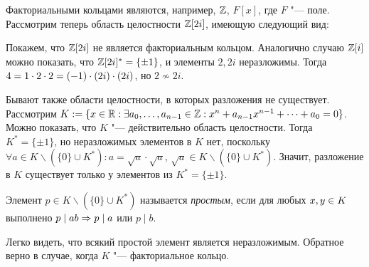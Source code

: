 \begin{example}
	Факториальными кольцами являются, например, $\mathbb{Z}$, $F[x]$, где $F$ "--- поле. Рассмотрим теперь область целостности $\mathbb{Z}[2i]$, имеющую следующий вид:
	\begin{center}
	\end{center}
	
	Покажем, что $\mathbb{Z}[2i]$ не является факториальным кольцом. Аналогично случаю $\mathbb{Z}[i]$ можно показать, что $\mathbb{Z}[2i]^* = \{\pm1\}$, и элементы $2, 2i$ неразложимы. Тогда $4 = 1 \cdot 2 \cdot 2 \hm= (-1)\cdot (2i) \cdot (2i)$, но $2 \not\sim 2i$.
\end{example}

\begin{note}
	Бывают также области целостности, в которых разложения не существует. Рассмотрим $K := \{x \in \mathbb{R}: \exists a_0, \dotsc, a_{n - 1} \in \mathbb{Z}: x^n + a_{n-1}x^{n-1} + \dotsb + a_0 = 0\}$. Можно показать, что $K$ "--- действительно область целостности. Тогда $K^* = \{\pm1\}$, но неразложимых элементов в $K$ нет, поскольку $\forall a \in K \backslash (\{0\} \cup K^*): a = \sqrt{a} \cdot \sqrt{a}$, $\sqrt{a} \in K \backslash (\{0\} \cup K^*)$. Значит, разложение в $K$ существует только у элементов из $K^* = \{\pm1\}$.
\end{note}

\begin{definition}
	Элемент $p \in K \backslash (\{0\} \cup K^*)$ называется \textit{простым}, если для любых $x, y \hm\in K$ выполнено $p \mid ab \Rightarrow p \mid a$ или $p \mid b$.
\end{definition}

\begin{note}
	Легко видеть, что всякий простой элемент является неразложимым. Обратное верно в случае, когда $K$ "--- факториальное кольцо.
\end{note}

